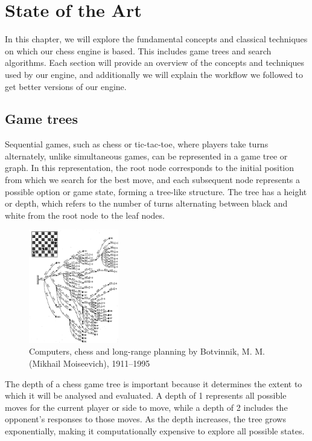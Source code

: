 \chapter{State of the Art}\label{cap:estadoDeLaCuestion}

In this chapter, we will explore the fundamental concepts and classical techniques on which our chess engine is based. This includes game trees and search algorithms. Each section will provide an overview of the concepts and techniques used by our engine, and additionally we will explain the workflow we followed to get better versions of our engine.

\section{Game trees}

Sequential games, such as chess or tic-tac-toe, where players take turns alternately, unlike simultaneous games, can be represented in a game tree or graph. In this representation, the root node corresponds to the initial position from which we search for the best move, and each subsequent node represents a possible option or game state, forming a tree-like structure. The tree has a height or depth, which refers to the number of turns alternating between black and white from the root node to the leaf nodes.

\begin{figure}[H]
    \centering
    \includegraphics[width=0.35\textwidth]{Imagenes/chess-game-tree.jpg}
    \caption{Computers, chess and long-range planning by Botvinnik, M. M. (Mikhail Moiseevich), 1911--1995}\label{fig:game-tree}
\end{figure}

\noindent The depth of a chess game tree is important because it determines the extent to which it will be analysed and evaluated. A depth of 1 represents all possible moves for the current player or side to move, while a depth of 2 includes the opponent's responses to those moves. As the depth increases, the tree grows exponentially, making it computationally expensive to explore all possible states.

